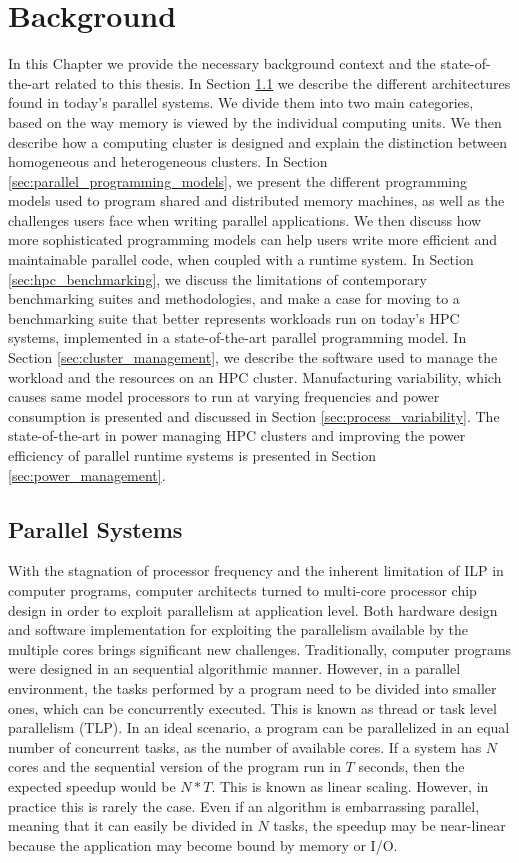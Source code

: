 
\chapter{Background}
\label{chap:background}

In this Chapter we provide the necessary background context and the state-of-the-art
related to this thesis.  In Section \ref{sec:parallel_systems} we describe the different
architectures found in today's parallel systems.  We divide them into two main categories,
based on the way memory is viewed by the individual computing units.  We then describe how
a computing cluster is designed and explain the distinction between homogeneous and
heterogeneous clusters.  In Section \ref{sec:parallel_programming_models}, we present the
different programming models used to program shared and distributed memory machines, as
well as the challenges users face when writing parallel applications.  We then discuss how
more sophisticated programming models can help users write more efficient and maintainable
parallel code, when coupled with a runtime system.  In Section \ref{sec:hpc_benchmarking},
we discuss the limitations of contemporary benchmarking suites and methodologies, and make
a case for moving to a benchmarking suite that better represents workloads run on today's
HPC systems, implemented in a state-of-the-art parallel programming model.  In Section
\ref{sec:cluster_management}, we describe the software used to manage the workload and the
resources on an HPC cluster.  Manufacturing variability, which causes same model
processors to run at varying frequencies and power consumption is presented and discussed
in Section \ref{sec:process_variability}.  The state-of-the-art in power managing HPC
clusters and improving the power efficiency of parallel runtime systems is presented in
Section \ref{sec:power_management}.

\section{Parallel Systems}
\label{sec:parallel_systems}
With the stagnation of processor frequency and the inherent limitation of ILP in computer
programs, computer architects turned to multi-core processor chip design in order to
exploit parallelism at application level.  Both hardware design and software
implementation for exploiting the parallelism available by the multiple cores brings
significant new challenges.  Traditionally, computer programs were designed in an
sequential algorithmic manner.  However, in a parallel environment, the tasks performed by
a program need to be divided into smaller ones, which can be concurrently executed.  This
is known as thread or task level parallelism (TLP).  In an ideal scenario, a program can
be parallelized in an equal number of concurrent tasks, as the number of available cores.
If a system has $N$ cores and the sequential version of the program run in $T$ seconds,
then the expected speedup would be $N*T$.  This is known as linear scaling.  However, in
practice this is rarely the case.  Even if an algorithm is embarrassing parallel, meaning
that it can easily be divided in $N$ tasks, the speedup may be near-linear because the
application may become bound by memory or I/O.   

